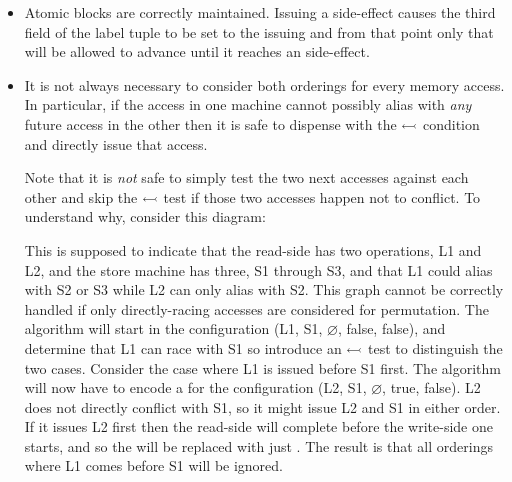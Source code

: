 \begin{itemize}
\item
  Atomic blocks are correctly maintained.  Issuing a
   side-effect causes the third field of the label
  tuple to be set to the issuing {\StateMachine} and from that point
  only that {\StateMachine} will be allowed to advance until it
  reaches an  side-effect.  

\item
  It is not always necessary to consider both orderings for every
  memory access.  In particular, if the access in one machine cannot
  possibly alias with \emph{any} future access in the other then it is
  safe to dispense with the $\leftarrowtail$ condition and directly
  issue that access.


  Note that it is \emph{not} safe to simply test the two next accesses
  against each other and skip the $\leftarrowtail$ test if those
  two accesses happen not to conflict.  To understand why, consider
  this diagram:



  This is supposed to indicate that the read-side {\StateMachine} has
  two operations, L1 and L2, and the store machine has three, S1
  through S3, and that L1 could alias with S2 or S3 while L2 can only
  alias with S2.  This graph cannot be correctly handled if only
  directly-racing accesses are considered for permutation.  The
  algorithm will start in the configuration (L1, S1, $\varnothing$,
  false, false), and determine that L1 can race with S1 so introduce
  an $\leftarrowtail$ test to distinguish the two cases.  Consider
  the case where L1 is issued before S1 first.  The algorithm will now
  have to encode a {\StateMachine} for the configuration (L2, S1,
  $\varnothing$, true, false).  L2 does not directly conflict with S1,
  so it might issue L2 and S1 in either order.  If it issues L2 first
  then the read-side {\StateMachine} will complete before the
  write-side one starts, and so the {\StateMachine} will be replaced
  with just .  The result is that all orderings where
  L1 comes before S1 will be ignored.


\end{itemize}
